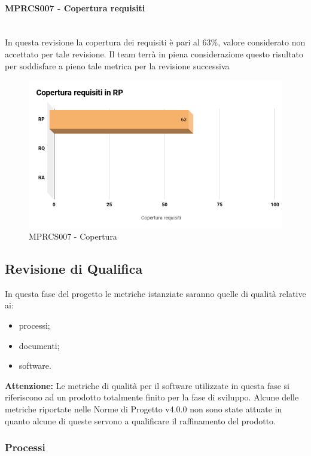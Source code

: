 \paragraph{MPRCS007 - Copertura requisiti}\mbox{}\\[0.4cm]
In questa revisione la copertura dei requisiti è pari al 63\%, valore considerato non accettato per tale revisione.
Il team terrà in piena considerazione questo risultato per soddisfare a pieno tale metrica per la revisione successiva
\begin{figure}[H]
	\centering
	\includegraphics[width=13cm,keepaspectratio]{../includes/pics/CoperturaRP.png}
	\caption{\label{fig:mission}MPRCS007 - Copertura}
\end{figure}

\clearpage
\subsection{Revisione di Qualifica}
\label{sec:revisione_qualifica}
In questa fase del progetto le metriche istanziate saranno quelle di qualità relative ai:
\begin{itemize}
	\item processi;
	\item documenti;
	\item software.
\end{itemize}
\textbf{Attenzione:} Le metriche di qualità per il software utilizzate in questa fase si riferiscono ad un prodotto totalmente finito per la fase di sviluppo. Alcune delle metriche riportate nelle Norme di Progetto v4.0.0 non sono state attuate in quanto alcune di queste servono a qualificare il raffinamento del prodotto.
\subsubsection{Processi}

